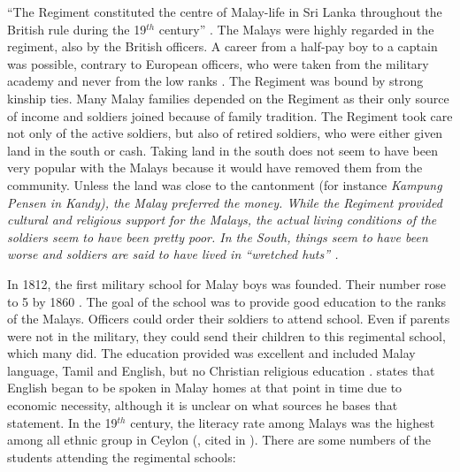  


 
``The Regiment constituted the centre of Malay-life in Sri Lanka throughout  the British rule during the 19$^{th}$ century'' \citep[93]{Hussainmiya1987}.
The Malays were highly regarded in the regiment, also by the British officers. A career from a half-pay boy to a captain was possible, contrary to European officers, who were taken from the military academy and never from the low ranks \citep[122]{Hussainmiya1990}.
The Regiment was bound by strong kinship ties. Many Malay families depended on the Regiment as their only source of income \citep[78]{Hussainmiya1990} and soldiers joined because of family tradition.
The Regiment took care not only of the active soldiers, but also of retired soldiers, who were either given land in the south or cash. Taking land in the south does not seem to have been very popular with the Malays because it would have removed them from the community. Unless the land was close to the cantonment (for instance \em Kampung Pensen \em in Kandy), the Malay preferred the money.
While the Regiment provided cultural and religious support for the Malays, the actual living conditions of the soldiers seem  to have been pretty poor. In the South, things seem to have been worse and soldiers are said to have lived in ``wretched huts'' \cite[115f]{Hussainmiya1990}.



In 1812, the first military school for Malay boys was founded. Their number rose to 5 by 1860 \citep[99]{Hussainmiya1990}. The goal of the school was to provide good education to the ranks of the Malays.  Officers could order their soldiers to attend school. Even if parents were not in the military, they could send their children to this regimental school, which many did. The education provided was excellent and included Malay language, Tamil and English, but no Christian religious education  \citep[96]{Hussainmiya1990}.
\citet[25]{Saldin2001} states that English began to be spoken in Malay homes at that point in time due to economic necessity, although it is unclear on what sources he bases that statement.
In the 19$^{th}$ century, the literacy rate among Malays was the highest among all ethnic group in Ceylon (\citet[48]{Marga1988}, cited in \citet[17]{Bichsel}). There are some numbers of the students attending the regimental schools:

